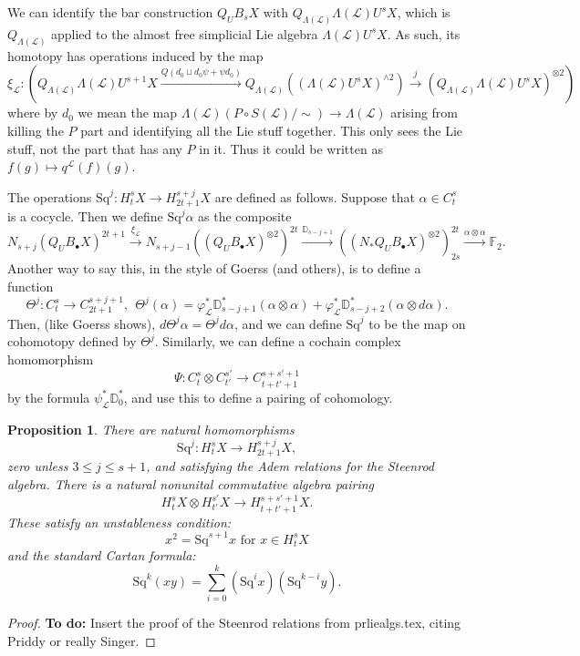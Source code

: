 \documentclass[11pt]{amsart}
\theoremstyle{plain}
\newtheorem{prop}[thm]{Proposition}
\theoremstyle{definition}
\let\phi\varphi
\renewcommand{\to}{\longrightarrow}
\newcommand{\scrL}{\mathscr{L}}
\newcommand{\calL}{\mathcal{L}}
\theoremstyle{plain}
\newcommand{\LieOperad}{{\scrL}}
\newcommand{\Sq}{\mathrm{Sq}}
\newcommand{\F}{\mathbb{F}}
\begin{document}
{\tiny
We can identify the bar construction $Q_UB_sX$ with
$Q_{\Lambda(\LieOperad)}\Lambda(\LieOperad)U^sX$,
which is $Q_{\Lambda(\LieOperad)}$ applied to the almost free simplicial Lie algebra $\Lambda(\LieOperad)U^sX$. As such, its homotopy has operations induced by the map
\[\xi_\LieOperad:\left(Q_{\Lambda(\LieOperad)}\Lambda(\LieOperad)U^{s+1}X
\overset{Q(d_0\sqcup d_0\psi+\psi d_0)}{\to}
Q_{\Lambda(\LieOperad)}((\Lambda(\LieOperad)U^sX)^{\wedge2})\overset{j}{\to}
(Q_{\Lambda(\LieOperad)}\Lambda(\LieOperad)U^sX)^{\otimes2}\right)\]
where by $d_0$ we mean the map $\Lambda(\LieOperad)(P\circ S(\LieOperad)/\sim)\to \Lambda(\LieOperad)$ arising from killing the $P$ part and identifying all the Lie stuff together. This only sees the Lie stuff, not the part that has any $P$ in it. Thus it could be written as $f(g)\mapsto q^\LieOperad(f)(g)$.

The operations $\Sq^j:H_t^{s}X\to H_{2t+1}^{s+j}X$ are defined as follows. Suppose that $\alpha\in C_t^{s}$ is a cocycle. Then we define $\Sq^j\alpha$ as the composite
\[N_{s+j}(Q_UB_{\bullet}X)^{2t+1}\overset{\xi_\calL}{\to}N_{s+j-1}((Q_UB_{\bullet}X)^{\otimes2})^{2t}\overset{\mathbb{D}_{s-j+1}}{\to}
((N_*Q_UB_{\bullet}X)^{\otimes2})^{2t}_{2s}\overset{\alpha\otimes\alpha}{\to}\F_2.
\]
Another way to say this, in the style of Goerss (and others), is to define a function
\[\Theta^j:C_{t}^{s}\to C_{2t+1}^{s+j+1},\ \ \Theta^j(\alpha)=\phi^*_\calL\mathbb{D}_{s-j+1}^*(\alpha\otimes\alpha)+ \phi^*_\calL\mathbb{D}_{s-j+2}^*(\alpha\otimes d\alpha).\]
Then, (like Goerss shows), $d\Theta^j\alpha=\Theta^jd\alpha$, and we can define $\Sq^j$ to be the map on cohomotopy defined by $\Theta^j$. Similarly, we can define a cochain complex homomorphism
\[\Psi:C_t^{s}\otimes C_{t'}^{s'}\to C_{t+t'+1}^{s+s'+1}\]
by the formula $\psi^*_\calL\mathbb{D}_0^*$, and use this to define a pairing of cohomology.
\begin{prop}
There are natural homomorphisms
\[\Sq^j:H_t^{s}X\to H_{2t+1}^{s+j}X,\]
zero unless $3\leq j\leq s+1$, and satisfying the Adem relations for the Steenrod algebra. There is a natural nonunital commutative algebra pairing
\[H_t^{s}X\otimes H_{t'}^{s'}X\to H_{t+t'+1}^{s+s'+1}X.\]
These satisfy an unstableness condition:
\[x^2=\Sq^{s+1}x\text{ for }x\in H^{s}_tX\]
and the standard Cartan formula:
\[\Sq^k(xy)=\sum_{i=0}^k(\Sq^ix)(\Sq^{k-i}y).\]
\end{prop}
\begin{proof}
\textbf{To do:} Insert the proof of the Steenrod relations from prliealgs.tex, citing Priddy or really Singer.
\end{proof}
}
\end{document}
